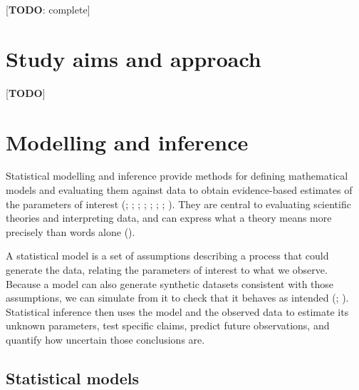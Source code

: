 \documentclass[
  11pt,
  a4paper,
]{report}
\begin{document}
{[}\textbf{TODO}: complete{]}

\section{Study aims and approach}\label{study-aims-and-approach}

{[}\textbf{TODO}{]}

\section{Modelling and inference}\label{modelling-and-inference}

Statistical modelling and inference provide methods for defining
mathematical models and evaluating them against data to obtain
evidence-based estimates of the parameters of interest
(; ;
; ; ;
; ;
). They are central to evaluating scientific theories and
interpreting data, and can express what a theory means more precisely
than words alone
().

A statistical model is a set of assumptions describing a process that
could generate the data, relating the parameters of interest to what we
observe. Because a model can also generate synthetic datasets consistent
with those assumptions, we can simulate from it to check that it behaves
as intended
(;
). Statistical inference then uses the model and the observed data
to estimate its unknown parameters, test specific claims, predict future
observations, and quantify how uncertain those conclusions are.

\subsection{Statistical models}\label{statistical-models}
\end{document}

